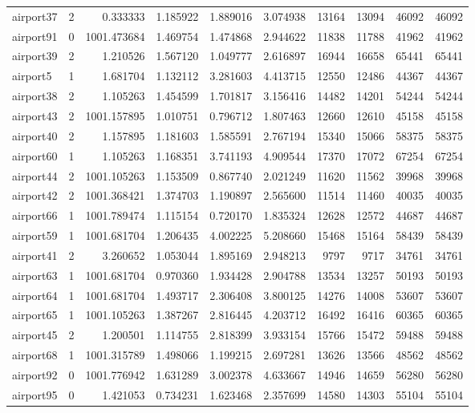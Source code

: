 \begin{longtable}{|l|r|r|r|r|r|r|r|r|r|}
airport37 & 2 & 0.333333 & 1.185922 & 1.889016 & 3.074938 & 13164 & 13094 & 46092 & 46092 \\
airport91 & 0 & 1001.473684 & 1.469754 & 1.474868 & 2.944622 & 11838 & 11788 & 41962 & 41962 \\
airport39 & 2 & 1.210526 & 1.567120 & 1.049777 & 2.616897 & 16944 & 16658 & 65441 & 65441 \\
airport5 & 1 & 1.681704 & 1.132112 & 3.281603 & 4.413715 & 12550 & 12486 & 44367 & 44367 \\
airport38 & 2 & 1.105263 & 1.454599 & 1.701817 & 3.156416 & 14482 & 14201 & 54244 & 54244 \\
airport43 & 2 & 1001.157895 & 1.010751 & 0.796712 & 1.807463 & 12660 & 12610 & 45158 & 45158 \\
airport40 & 2 & 1.157895 & 1.181603 & 1.585591 & 2.767194 & 15340 & 15066 & 58375 & 58375 \\
airport60 & 1 & 1.105263 & 1.168351 & 3.741193 & 4.909544 & 17370 & 17072 & 67254 & 67254 \\
airport44 & 2 & 1001.105263 & 1.153509 & 0.867740 & 2.021249 & 11620 & 11562 & 39968 & 39968 \\
airport42 & 2 & 1001.368421 & 1.374703 & 1.190897 & 2.565600 & 11514 & 11460 & 40035 & 40035 \\
airport66 & 1 & 1001.789474 & 1.115154 & 0.720170 & 1.835324 & 12628 & 12572 & 44687 & 44687 \\
airport59 & 1 & 1001.681704 & 1.206435 & 4.002225 & 5.208660 & 15468 & 15164 & 58439 & 58439 \\
airport41 & 2 & 3.260652 & 1.053044 & 1.895169 & 2.948213 & 9797 & 9717 & 34761 & 34761 \\
airport63 & 1 & 1001.681704 & 0.970360 & 1.934428 & 2.904788 & 13534 & 13257 & 50193 & 50193 \\
airport64 & 1 & 1001.681704 & 1.493717 & 2.306408 & 3.800125 & 14276 & 14008 & 53607 & 53607 \\
airport65 & 1 & 1001.105263 & 1.387267 & 2.816445 & 4.203712 & 16492 & 16416 & 60365 & 60365 \\
airport45 & 2 & 1.200501 & 1.114755 & 2.818399 & 3.933154 & 15766 & 15472 & 59488 & 59488 \\
airport68 & 1 & 1001.315789 & 1.498066 & 1.199215 & 2.697281 & 13626 & 13566 & 48562 & 48562 \\
airport92 & 0 & 1001.776942 & 1.631289 & 3.002378 & 4.633667 & 14946 & 14659 & 56280 & 56280 \\
airport95 & 0 & 1.421053 & 0.734231 & 1.623468 & 2.357699 & 14580 & 14303 & 55104 & 55104 \\

\end{longtable}
